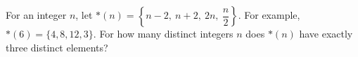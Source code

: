 For an integer $n$, let $*(n)=\left\{n-2,\ n+2,\ 2n,\ \dfrac{n}{2}\right\}$. For example, $*(6)=\{4,8,12,3\}$. For how many distinct integers $n$ does $*(n)$ have exactly three distinct elements?
